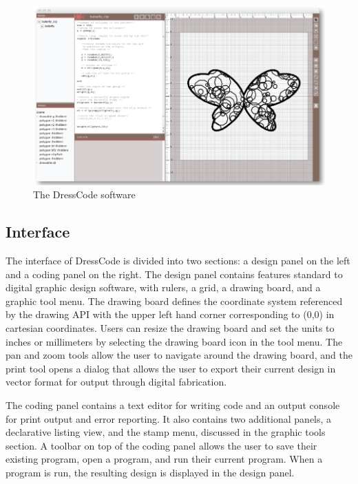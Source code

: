 \documentclass{sigchi}
\begin{document}
\begin{center}
\begin{figure}[h!]
\includegraphics[width=\columnwidth]{images/dresscode_interface.jpg}
\caption{The DressCode software}
\label{fig:dresscode_interface}
\end{figure}
\end{center}
\vspace{-20pt}
\subsection{Interface}
The interface of DressCode is divided into two sections: a design panel on the left and a coding panel on the right. The design panel contains features standard to digital graphic design software, with rulers, a grid, a drawing board, and a graphic tool menu. The drawing board defines the coordinate system referenced by the drawing API with the upper left hand corner corresponding to (0,0) in cartesian coordinates. Users can resize the drawing board and set the units to inches or millimeters by selecting the drawing board icon in the tool menu. The pan and zoom tools allow the user to navigate around the drawing board, and the print tool opens a dialog that allows the user to export their current design in vector format for output through digital fabrication. 

The coding panel contains a text editor for writing code and an output console for print output and error reporting. It also contains two additional panels, a declarative listing view, and the stamp menu, discussed in the graphic tools section. A toolbar on top of the coding panel allows the user to save their existing program, open a program, and run their current program. When a program is run, the resulting design is displayed in the design panel.
\end{document}
